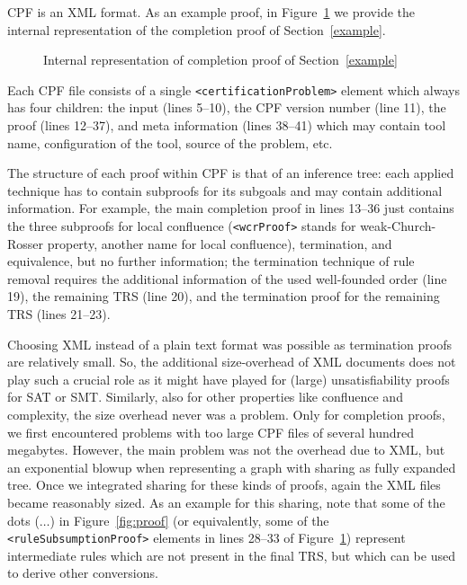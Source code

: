 \documentclass[USenglish]{eptcs}
\newlength{\len}
\newcommand{\rSC}[1]{Section~\ref{#1}}
\newcommand{\rFI}[1]{Figure~\ref{#1}}
\begin{document}
CPF is an XML format. As an example proof, in \rFI{xml} we provide the internal representation of
the completion proof of \rSC{example}.
\begin{figure}

\caption{Internal representation of completion proof of \rSC{example}}\label{xml}
\end{figure}
Each CPF file consists of a single \lstinline!<certificationProblem>! element which 
always has four children: 
the input (lines 5--10), the CPF version number
(line 11), the proof (lines 12--37), and meta information (lines 38--41) which may contain
tool name, configuration of the tool, source of the problem, etc. 

The structure of each proof within CPF is that of an inference tree: each applied technique 
has to contain subproofs for its subgoals and may contain additional information.
For example, the main completion proof in lines 13--36 just contains the three subproofs 
for local confluence (\lstinline!<wcrProof>! stands for weak-Church-Rosser property, another name 
for local confluence), termination, and
equivalence, but no further information; the termination technique of rule removal requires
the additional information of the used well-founded order (line 19), the remaining
TRS (line 20), and the termination proof for the remaining TRS (lines 21--23).

Choosing XML instead of a plain text format was possible as termination
proofs are relatively small. So, the additional size-overhead of XML documents does
not play such a crucial role as it might have played for (large) 
unsatisfiability proofs for SAT or SMT. Similarly, also for other properties like
confluence and complexity, the size overhead never was a problem. Only for completion proofs,
we first encountered problems with too large CPF files of several hundred megabytes. However,
the main problem was not the overhead due to XML, but an exponential blowup when representing
a graph with sharing as fully expanded tree. Once we integrated sharing for these kinds of 
proofs, again the XML files became reasonably sized. As an example for this sharing, 
note that some of the dots ($\ldots$) in \rFI{fig:proof} (or equivalently, some of the
\lstinline!<ruleSubsumptionProof>! elements in lines 28--33 of \rFI{xml}) 
represent intermediate rules which are
not present in the final TRS, but which can be used to derive other conversions.
\end{document}
